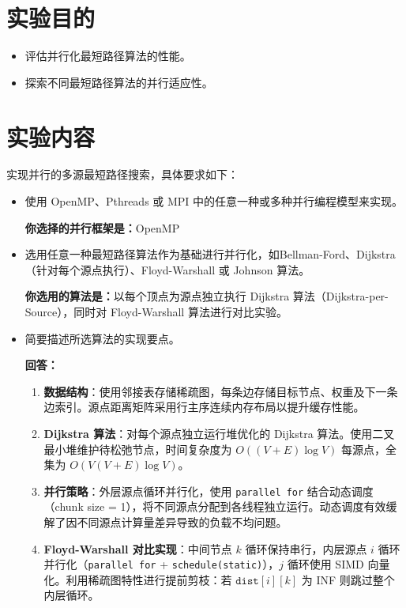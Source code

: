 \documentclass{SYSUReport}
\date{2026年6月2日}
\begin{document}
\cover
\thispagestyle{empty} %
\clearpage

\setcounter{page}{1}

\section{实验目的}
\begin{itemize}
    \item 评估并行化最短路径算法的性能。
    \item 探索不同最短路径算法的并行适应性。
\end{itemize}

\section{实验内容}
实现并行的多源最短路径搜索，具体要求如下：
\begin{itemize}
\item 使用 OpenMP、Pthreads 或 MPI 中的任意一种或多种并行编程模型来实现。

\textbf{你选择的并行框架是：}OpenMP

\item 选用任意一种最短路径算法作为基础进行并行化，如Bellman-Ford、Dijkstra（针对每个源点执行）、Floyd-Warshall 或 Johnson 算法。

\textbf{你选用的算法是：}以每个顶点为源点独立执行 Dijkstra 算法（Dijkstra-per-Source），同时对 Floyd-Warshall 算法进行对比实验。

\item 简要描述所选算法的实现要点。

\textbf{回答：}
\begin{enumerate}
    \item \textbf{数据结构}：使用邻接表存储稀疏图，每条边存储目标节点、权重及下一条边索引。源点距离矩阵采用行主序连续内存布局以提升缓存性能。
    \item \textbf{Dijkstra 算法}：对每个源点独立运行堆优化的 Dijkstra 算法。使用二叉最小堆维护待松弛节点，时间复杂度为 $O((V+E)\log V)$ 每源点，全集为 $O(V(V+E)\log V)$。
    \item \textbf{并行策略}：外层源点循环并行化，使用 \texttt{parallel for} 结合动态调度（chunk size = 1），将不同源点分配到各线程独立运行。动态调度有效缓解了因不同源点计算量差异导致的负载不均问题。
    \item \textbf{Floyd-Warshall 对比实现}：中间节点 $k$ 循环保持串行，内层源点 $i$ 循环并行化（\texttt{parallel for} + \texttt{schedule(static)}），$j$ 循环使用 SIMD 向量化。利用稀疏图特性进行提前剪枝：若 $\texttt{dist}[i][k]$ 为 INF 则跳过整个内层循环。
\end{enumerate}
\end{itemize}
\end{document}
